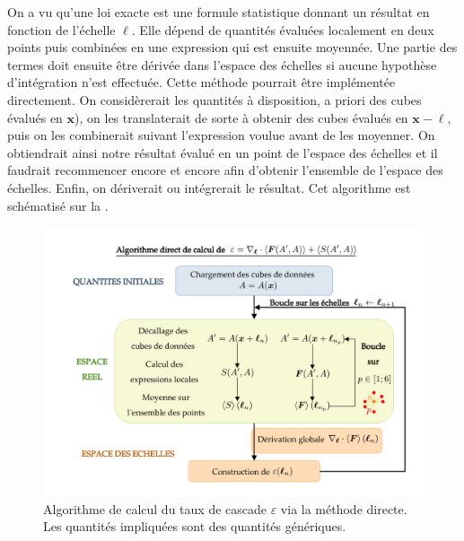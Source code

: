  On a vu qu'une loi exacte est une formule statistique donnant un résultat en fonction de l'échelle $\boldsymbol{\ell}$. Elle dépend de quantités évaluées localement en deux points puis combinées en une expression qui est ensuite moyennée. Une partie des termes doit ensuite être dérivée dans l'espace des échelles si aucune hypothèse d'intégration n'est effectuée. Cette méthode pourrait être implémentée directement. On considèrerait les quantités à disposition, a priori des cubes évalués en $\boldsymbol{x}$), on les translaterait de sorte à obtenir des cubes évalués en $\boldsymbol{x} - \boldsymbol{\ell}$, puis on les combinerait suivant l'expression voulue avant de les moyenner. On obtiendrait ainsi notre résultat évalué en un point de l'espace des échelles et il faudrait recommencer encore et encore afin d'obtenir l'ensemble de l'espace des échelles. Enfin, on dériverait ou intégrerait le résultat. Cet algorithme est schématisé sur la .
 \begin{figure}[!ht]
  \centering
 \includegraphics[width=0.9\linewidth,trim=2cm 1cm 1cm 1cm, clip=true]{./Mainmatter/Part_3/images_ch1/code_EL_direct}
 \cprotect\caption{Algorithme de calcul du taux de cascade \ensuremath{\varepsilon} via la méthode directe. Les quantités impliquées sont des quantités génériques.}
 \label{fig:algo_direct}
 \end{figure}
 
